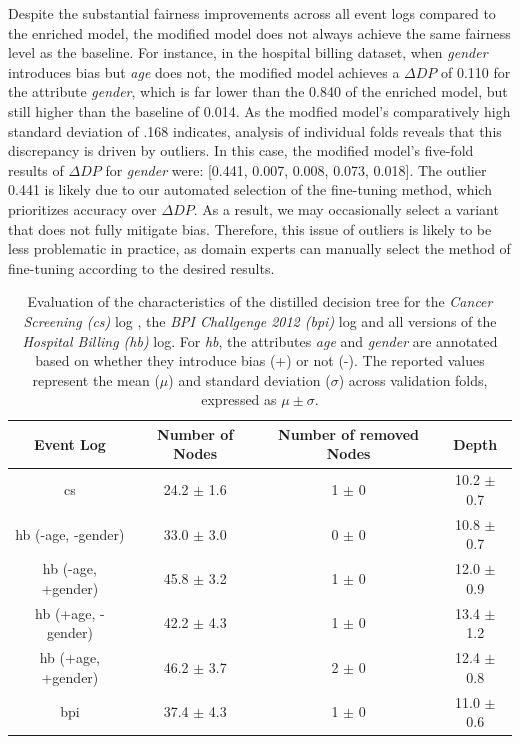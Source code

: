Despite the substantial fairness improvements across all event logs compared to the enriched model,
the modified model does not always achieve the same fairness level as the baseline.
For instance, in the hospital billing dataset, when \textit{gender} introduces bias but \textit{age} does not,
the modified model achieves a $\Delta \textit{DP}$ of 0.110 for the attribute \textit{gender},
which is far lower than the 0.840 of the enriched model,
but still higher than the baseline of 0.014.
As the modfied model's comparatively high standard deviation of .168 indicates,
analysis of individual folds reveals that this discrepancy is driven by outliers.
In this case, the modified model's five-fold results of $\Delta \textit{DP}$ for \textit{gender} were: [0.441, 0.007, 0.008, 0.073, 0.018].
The outlier 0.441 is likely due to our automated selection of the fine-tuning method,
which prioritizes accuracy over $\Delta \textit{DP}$.
As a result, we may occasionally select a variant that does not fully mitigate bias.
Therefore, this issue of outliers is likely to be less problematic in practice,
as domain experts can manually select the method of fine-tuning according to the desired results.

\begin{table}[h!]
    \centering
    \scriptsize
    \renewcommand{\arraystretch}{1.2}
    \setlength{\tabcolsep}{6pt}
    \begin{tabular}{>{\centering\arraybackslash}c | c | c | c}
        \toprule
        \textbf{Event Log} & \textbf{Number of Nodes} & \textbf{Number of removed Nodes} & \textbf{Depth} \\
        \midrule
        cs &  24.2 $\pm$ 1.6 &  1 $\pm$ 0 & 10.2 $\pm$ 0.7 \\
        hb (-age, -gender) &  33.0 $\pm$ 3.0 &  0 $\pm$ 0 &  10.8 $\pm$ 0.7 \\
        hb (-age, +gender) &  45.8 $\pm$ 3.2 &  1 $\pm$ 0 &  12.0 $\pm$ 0.9 \\
        hb (+age, -gender) &  42.2 $\pm$ 4.3 &  1 $\pm$ 0 &  13.4 $\pm$ 1.2 \\
        hb (+age, +gender) &  46.2 $\pm$ 3.7 &  2 $\pm$ 0 &  12.4 $\pm$ 0.8 \\
        bpi &  37.4 $\pm$ 4.3 &  1 $\pm$ 0 &  11.0 $\pm$ 0.6 \\
        \bottomrule
    \end{tabular}
    \vspace{0.2cm} %
    \caption{Evaluation of the characteristics of the distilled decision tree for the \textit{Cancer Screening (cs)} log ,
    the \textit{BPI Challgenge 2012 (bpi)} log and all versions of the \textit{Hospital Billing (hb)} log.
    For \textit{hb}, the attributes \textit{age} and \textit{gender} are annotated based on whether they introduce bias (+) or not (-).
    The reported values represent the mean ($\mu$) and standard deviation ($\sigma$) across validation folds, expressed as $\mu \pm \sigma$.
    }
    \label{tab:evaluation_nodes}
\end{table}

